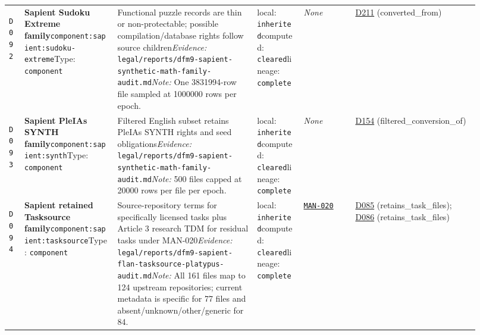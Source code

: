 \documentclass[9pt,a4paper]{article}
\newcommand{\depid}[1]{\hypertarget{dep:#1}{\texttt{#1}}}
\begin{document}
\begin{landscape}
\begin{longtable}{@{}L{0.035\linewidth}L{0.185\linewidth}L{0.27\linewidth}L{0.09\linewidth}L{0.10\linewidth}L{0.24\linewidth}@{}}
\depid{D092} & \textbf{Sapient Sudoku Extreme family}\newline \nolinkurl{component:sapient:sudoku-extreme}\newline Type: \texttt{component} & Functional puzzle records are thin or non-protectable; possible compilation/database rights follow source children\newline \textit{Evidence:} \nolinkurl{legal/reports/dfm9-sapient-synthetic-math-family-audit.md}\newline \textit{Note:} One 3831994-row file sampled at 1000000 rows per epoch. & local: \texttt{inherited}\newline computed: \texttt{cleared}\newline lineage: \texttt{complete} & \textit{None} & \hyperlink{dep:D211}{D211} (converted\_from) \\
\depid{D093} & \textbf{Sapient PleIAs SYNTH family}\newline \nolinkurl{component:sapient:synth}\newline Type: \texttt{component} & Filtered English subset retains PleIAs SYNTH rights and seed obligations\newline \textit{Evidence:} \nolinkurl{legal/reports/dfm9-sapient-synthetic-math-family-audit.md}\newline \textit{Note:} 500 files capped at 20000 rows per file per epoch. & local: \texttt{inherited}\newline computed: \texttt{cleared}\newline lineage: \texttt{complete} & \textit{None} & \hyperlink{dep:D154}{D154} (filtered\_conversion\_of) \\
\depid{D094} & \textbf{Sapient retained Tasksource family}\newline \nolinkurl{component:sapient:tasksource}\newline Type: \texttt{component} & Source-repository terms for specifically licensed tasks plus Article 3 research TDM for residual tasks under MAN-020\newline \textit{Evidence:} \nolinkurl{legal/reports/dfm9-sapient-flan-tasksource-platypus-audit.md}\newline \textit{Note:} All 161 files map to 124 upstream repositories; current metadata is specific for 77 files and absent/unknown/other/generic for 84. & local: \texttt{inherited}\newline computed: \texttt{cleared}\newline lineage: \texttt{complete} & \hyperlink{manual:MAN-020}{\texttt{MAN-020}} & \hyperlink{dep:D085}{D085} (retains\_task\_files); \hyperlink{dep:D086}{D086} (retains\_task\_files) \\

\end{longtable}
\end{landscape}
\end{document}

